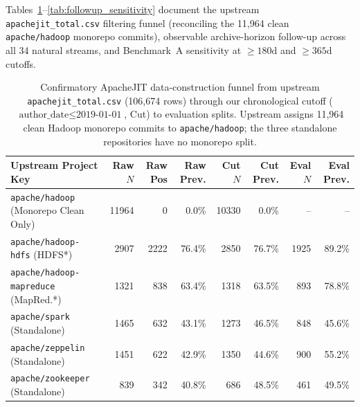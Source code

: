 \documentclass[10pt,a4paper]{article}
\begin{document}
Tables~\ref{tab:confirmatory_funnel}--\ref{tab:followup_sensitivity} document the upstream \texttt{apachejit\_total.csv} filtering funnel (reconciling the 11,964 clean \texttt{apache/hadoop} monorepo commits), observable archive-horizon follow-up across all 34 natural streams, and Benchmark~A sensitivity at $\ge 180\text{d}$ and $\ge 365\text{d}$ cutoffs.

\begin{table}[!htbp]
\centering
\caption{Confirmatory ApacheJIT data-construction funnel from upstream \texttt{apachejit\_total.csv} (106,674 rows) through our chronological cutoff ($\text{author\_date} \le \text{2019-01-01}$, Cut) to evaluation splits. Upstream assigns 11,964 clean Hadoop monorepo commits to \texttt{apache/hadoop}; the three standalone repositories have no monorepo split.}
\label{tab:confirmatory_funnel}
\fontsize{7.5}{9.0}\selectfont
\setlength{\tabcolsep}{2.0pt}
\begin{tabular*}{\textwidth}{@{\extracolsep\fill}lrrrrrrr@{}}
\toprule
\textbf{Upstream Project Key} & \textbf{Raw $N$} & \textbf{Raw Pos} & \textbf{Raw Prev.} & \textbf{Cut $N$} & \textbf{Cut Prev.} & \textbf{Eval $N$} & \textbf{Eval Prev.} \\
\midrule
\texttt{apache/hadoop} (Monorepo Clean Only) & 11964 & 0 & 0.0\% & 10330 & 0.0\% & -- & -- \\
\midrule
\texttt{apache/hadoop-hdfs} (HDFS*) & 2907 & 2222 & 76.4\% & 2850 & 76.7\% & 1925 & 89.2\% \\
\texttt{apache/hadoop-mapreduce} (MapRed.*) & 1321 & 838 & 63.4\% & 1318 & 63.5\% & 893 & 78.8\% \\
\midrule
\texttt{apache/spark} (Standalone) & 1465 & 632 & 43.1\% & 1273 & 46.5\% & 848 & 45.6\% \\
\texttt{apache/zeppelin} (Standalone) & 1451 & 622 & 42.9\% & 1350 & 44.6\% & 900 & 55.2\% \\
\texttt{apache/zookeeper} (Standalone) & 839 & 342 & 40.8\% & 686 & 48.5\% & 461 & 49.5\% \\
\bottomrule
\end{tabular*}
\end{table}
\end{document}
